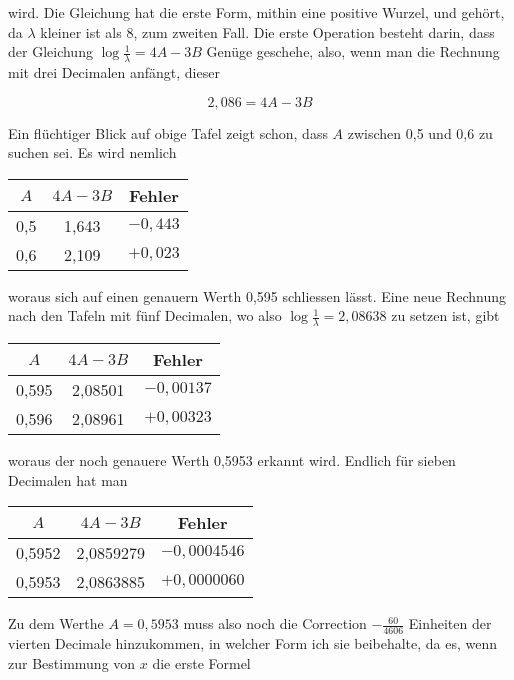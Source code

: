 \documentclass[10pt]{article}
\begin{document}
wird. Die Gleichung hat die erste Form, mithin eine positive Wurzel, und gehört, da \(\lambda\) kleiner ist als 8, zum zweiten Fall. Die erste Operation besteht darin, dass der Gleichung \(\log \frac{1}{\lambda}=4 A-3 B\) Genüge geschehe, also, wenn man die Rechnung mit drei Decimalen anfängt, dieser

\[
2,086=4 A-3 B
\]

Ein flüchtiger Blick auf obige Tafel zeigt schon, dass \(A\) zwischen 0,5 und 0,6 zu suchen sei. Es wird nemlich

\begin{center}
\begin{tabular}{c|c|c}
\(A\) & \(4 A-3 B\) & Fehler \\
\hline
0,5 & 1,643 & \(-0,443\) \\
0,6 & 2,109 & \(+0,023\) \\
\end{tabular}
\end{center}

woraus sich auf einen genauern Werth 0,595 schliessen lässt. Eine neue Rechnung nach den Tafeln mit fünf Decimalen, wo also \(\log \frac{1}{\lambda}=2,08638\) zu setzen ist, gibt

\begin{center}
\begin{tabular}{c|c|c}
\(A\) & \(4 A-3 B\) & Fehler \\
\hline
0,595 & 2,08501 & \(-0,00137\) \\
0,596 & 2,08961 & \(+0,00323\) \\
\end{tabular}
\end{center}

woraus der noch genauere Werth 0,5953 erkannt wird. Endlich für sieben Decimalen hat man

\begin{center}
\begin{tabular}{c|c|c}
\(A\) & \(4 A-3 B\) & Fehler \\
\hline
0,5952 & 2,0859279 & \(-0,0004546\) \\
0,5953 & 2,0863885 & \(+0,0000060\) \\
\end{tabular}
\end{center}

Zu dem Werthe \(A=0,5953\) muss also noch die Correction \(-\frac{60}{4606}\) Einheiten der vierten Decimale hinzukommen, in welcher Form ich sie beibehalte, da es, wenn zur Bestimmung von \(x\) die erste Formel
\end{document}
